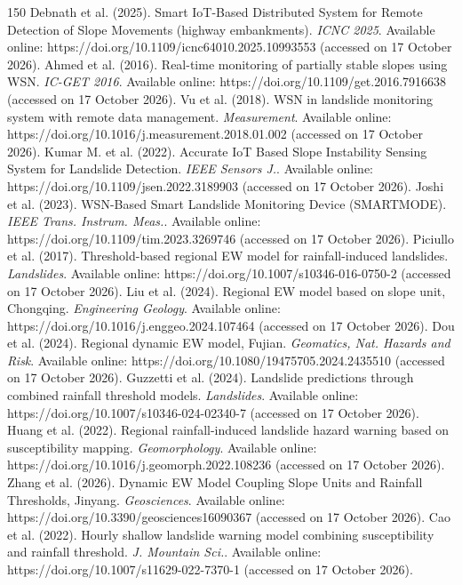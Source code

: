\begin{thebibliography}{150}
Debnath et al. (2025). Smart IoT-Based Distributed System for Remote Detection of Slope Movements (highway embankments). \textit{ICNC 2025}. Available online: https://doi.org/10.1109/icnc64010.2025.10993553 (accessed on 17 October 2026).
Ahmed et al. (2016). Real-time monitoring of partially stable slopes using WSN. \textit{IC-GET 2016}. Available online: https://doi.org/10.1109/get.2016.7916638 (accessed on 17 October 2026).
Vu et al. (2018). WSN in landslide monitoring system with remote data management. \textit{Measurement}. Available online: https://doi.org/10.1016/j.measurement.2018.01.002 (accessed on 17 October 2026).
Kumar M. et al. (2022). Accurate IoT Based Slope Instability Sensing System for Landslide Detection. \textit{IEEE Sensors J.}. Available online: https://doi.org/10.1109/jsen.2022.3189903 (accessed on 17 October 2026).
Joshi et al. (2023). WSN-Based Smart Landslide Monitoring Device (SMARTMODE). \textit{IEEE Trans. Instrum. Meas.}. Available online: https://doi.org/10.1109/tim.2023.3269746 (accessed on 17 October 2026).
Piciullo et al. (2017). Threshold-based regional EW model for rainfall-induced landslides. \textit{Landslides}. Available online: https://doi.org/10.1007/s10346-016-0750-2 (accessed on 17 October 2026).
Liu et al. (2024). Regional EW model based on slope unit, Chongqing. \textit{Engineering Geology}. Available online: https://doi.org/10.1016/j.enggeo.2024.107464 (accessed on 17 October 2026).
Dou et al. (2024). Regional dynamic EW model, Fujian. \textit{Geomatics, Nat. Hazards and Risk}. Available online: https://doi.org/10.1080/19475705.2024.2435510 (accessed on 17 October 2026).
Guzzetti et al. (2024). Landslide predictions through combined rainfall threshold models. \textit{Landslides}. Available online: https://doi.org/10.1007/s10346-024-02340-7 (accessed on 17 October 2026).
Huang et al. (2022). Regional rainfall-induced landslide hazard warning based on susceptibility mapping. \textit{Geomorphology}. Available online: https://doi.org/10.1016/j.geomorph.2022.108236 (accessed on 17 October 2026).
Zhang et al. (2026). Dynamic EW Model Coupling Slope Units and Rainfall Thresholds, Jinyang. \textit{Geosciences}. Available online: https://doi.org/10.3390/geosciences16090367 (accessed on 17 October 2026).
Cao et al. (2022). Hourly shallow landslide warning model combining susceptibility and rainfall threshold. \textit{J. Mountain Sci.}. Available online: https://doi.org/10.1007/s11629-022-7370-1 (accessed on 17 October 2026).

\end{thebibliography}
